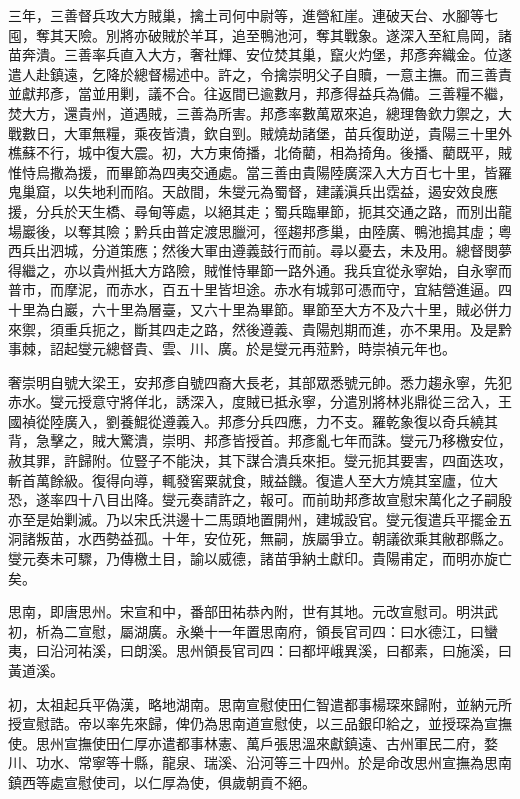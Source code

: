 \begin{pinyinscope}
三年，三善督兵攻大方賊巢，擒土司何中尉等，進營紅崖。連破天台、水腳等七囤，奪其天險。別將亦破賊於羊耳，追至鴨池河，奪其戰象。遂深入至紅鳥岡，諸苗奔潰。三善率兵直入大方，奢社輝、安位焚其巢，竄火灼堡，邦彥奔織金。位遂遣人赴鎮遠，乞降於總督楊述中。許之，令擒崇明父子自贖，一意主撫。而三善責並獻邦彥，當並用剿，議不合。往返間已逾數月，邦彥得益兵為備。三善糧不繼，焚大方，還貴州，道遇賊，三善為所害。邦彥率數萬眾來追，總理魯欽力禦之，大戰數日，大軍無糧，乘夜皆潰，欽自剄。賊燒劫諸堡，苗兵復助逆，貴陽三十里外樵蘇不行，城中復大震。初，大方東倚播，北倚藺，相為掎角。後播、藺既平，賊惟恃烏撒為援，而畢節為四夷交通處。當三善由貴陽陸廣深入大方百七十里，皆羅鬼巢窟，以失地利而陷。天啟間，朱燮元為蜀督，建議滇兵出霑益，遏安效良應援，分兵於天生橋、尋甸等處，以絕其走；蜀兵臨畢節，扼其交通之路，而別出龍場巖後，以奪其險；黔兵由普定渡思臘河，徑趨邦彥巢，由陸廣、鴨池搗其虛；粵西兵出泗城，分道策應；然後大軍由遵義鼓行而前。尋以憂去，未及用。總督閔夢得繼之，亦以貴州抵大方路險，賊惟恃畢節一路外通。我兵宜從永寧始，自永寧而普市，而摩泥，而赤水，百五十里皆坦途。赤水有城郭可憑而守，宜結營進逼。四十里為白巖，六十里為層臺，又六十里為畢節。畢節至大方不及六十里，賊必併力來禦，須重兵扼之，斷其四走之路，然後遵義、貴陽剋期而進，亦不果用。及是黔事棘，詔起燮元總督貴、雲、川、廣。於是燮元再蒞黔，時崇禎元年也。

奢崇明自號大梁王，安邦彥自號四裔大長老，其部眾悉號元帥。悉力趨永寧，先犯赤水。燮元授意守將佯北，誘深入，度賊已抵永寧，分遣別將林兆鼎從三岔入，王國禎從陸廣入，劉養鯤從遵義入。邦彥分兵四應，力不支。羅乾象復以奇兵繞其背，急擊之，賊大驚潰，崇明、邦彥皆授首。邦彥亂七年而誅。燮元乃移檄安位，赦其罪，許歸附。位豎子不能決，其下謀合潰兵來拒。燮元扼其要害，四面迭攻，斬首萬餘級。復得向導，輒發窖粟就食，賊益饑。復遣人至大方燒其室廬，位大恐，遂率四十八目出降。燮元奏請許之，報可。而前助邦彥故宣慰宋萬化之子嗣殷亦至是始剿滅。乃以宋氏洪邊十二馬頭地置開州，建城設官。燮元復遣兵平擺金五洞諸叛苗，水西勢益孤。十年，安位死，無嗣，族屬爭立。朝議欲乘其敝郡縣之。燮元奏未可驟，乃傳檄土目，諭以威德，諸苗爭納土獻印。貴陽甫定，而明亦旋亡矣。

思南，即唐思州。宋宣和中，番部田祐恭內附，世有其地。元改宣慰司。明洪武初，析為二宣慰，屬湖廣。永樂十一年置思南府，領長官司四：曰水德江，曰蠻夷，曰沿河祐溪，曰朗溪。思州領長官司四：曰都坪峨異溪，曰都素，曰施溪，曰黃道溪。

初，太祖起兵平偽漢，略地湖南。思南宣慰使田仁智遣都事楊琛來歸附，並納元所授宣慰誥。帝以率先來歸，俾仍為思南道宣慰使，以三品銀印給之，並授琛為宣撫使。思州宣撫使田仁厚亦遣都事林憲、萬戶張思溫來獻鎮遠、古州軍民二府，婺川、功水、常寧等十縣，龍泉、瑞溪、沿河等三十四州。於是命改思州宣撫為思南鎮西等處宣慰使司，以仁厚為使，俱歲朝貢不絕。


\end{pinyinscope}
